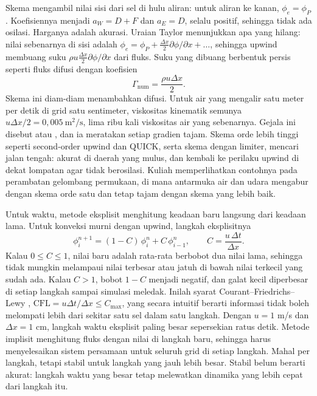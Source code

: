 Skema  mengambil nilai sisi dari sel di hulu aliran: untuk aliran ke kanan, $\phi_e=\phi_P$.
Koefisiennya menjadi $a_W=D+F$ dan $a_E=D$, selalu positif, sehingga tidak ada osilasi. Harganya adalah akurasi.
Uraian Taylor menunjukkan apa yang hilang: nilai sebenarnya di sisi adalah
$\phi_e=\phi_P+\tfrac{\Delta x}{2}\partial\phi/\partial x+\dots$, sehingga upwind membuang suku
$\rho u\tfrac{\Delta x}{2}\partial\phi/\partial x$ dari fluks. Suku yang dibuang berbentuk persis seperti fluks
difusi dengan koefisien
\begin{equation}
\Gamma_{\mathrm{num}}=\frac{\rho u\Delta x}{2}.
\end{equation}
Skema ini diam-diam menambahkan difusi. Untuk air yang mengalir satu meter per detik di grid satu sentimeter,
viskositas kinematik semunya $u\Delta x/2=0{,}005\ \mathrm{m^2/s}$, lima ribu kali viskositas air yang
sebenarnya. Gejala ini disebut  atau , dan ia meratakan setiap
gradien tajam. Skema orde lebih tinggi seperti second-order upwind dan QUICK, serta skema dengan limiter, mencari
jalan tengah: akurat di daerah yang mulus, dan kembali ke perilaku upwind di dekat lompatan agar tidak berosilasi.
Kuliah memperlihatkan contohnya pada perambatan gelombang permukaan, di mana antarmuka air dan udara mengabur
dengan skema orde satu dan tetap tajam dengan skema yang lebih baik.

Untuk waktu, metode eksplisit menghitung keadaan baru langsung dari keadaan lama. Untuk konveksi murni dengan
upwind, langkah eksplisitnya
\begin{equation}
\phi_i^{n+1}=(1-C)\,\phi_i^n+C\,\phi_{i-1}^n,\qquad C=\frac{u\,\Delta t}{\Delta x}.
\end{equation}
Kalau $0\le C\le1$, nilai baru adalah rata-rata berbobot dua nilai lama, sehingga tidak mungkin melampaui
nilai terbesar atau jatuh di bawah nilai terkecil yang sudah ada. Kalau $C>1$, bobot $1-C$ menjadi negatif, dan
galat kecil diperbesar di setiap langkah sampai simulasi meledak. Inilah syarat Courant--Friedrichs--Lewy
\citep{courant1928}, $\mathrm{CFL}=u\Delta t/\Delta x\le C_{\max}$, yang secara intuitif berarti informasi tidak
boleh melompati lebih dari sekitar satu sel dalam satu langkah. Dengan $u=1$ m/s dan $\Delta x=1$ cm, langkah
waktu eksplisit paling besar sepersekian ratus detik. Metode implisit menghitung fluks dengan nilai di langkah
baru, sehingga harus menyelesaikan sistem persamaan untuk seluruh grid di setiap langkah. Mahal per langkah,
tetapi stabil untuk langkah yang jauh lebih besar. Stabil belum berarti akurat: langkah waktu yang besar tetap
melewatkan dinamika yang lebih cepat dari langkah itu.

